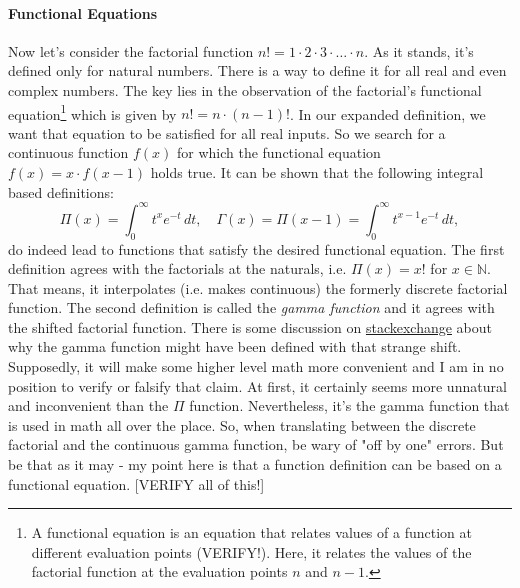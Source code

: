 


\paragraph{Functional Equations}
Now let's consider the factorial function $n! = 1 \cdot 2 \cdot 3 \cdot \ldots \cdot n$. As it stands, it's defined only for natural numbers. There is a way to define it for all real and even complex numbers. The key lies in the observation of the factorial's functional equation\footnote{A functional equation is an equation that relates values of a function at different evaluation points (VERIFY!). Here, it relates the values of the factorial function at the evaluation points $n$ and $n-1$.} which is given by $n! = n \cdot (n-1)!$. In our expanded definition, we want that equation to be satisfied for all real inputs. So we search for a continuous function $f(x)$ for which the functional equation $f(x) = x \cdot f(x-1)$ holds true. It can be shown that the following integral based definitions:
\begin{equation}
\Pi(x)    = \int_0^\infty t^x e^{-t} \, dt, \quad
\Gamma(x) = \Pi(x-1) = \int_0^\infty t^{x-1} e^{-t} \, dt,
\end{equation}
do indeed lead to functions that satisfy the desired functional equation. The first definition agrees with the factorials at the naturals, i.e. $\Pi(x) = x!$ for $x \in \mathbb{N}$. That means, it interpolates (i.e. makes continuous) the formerly discrete factorial function. The second definition is called the \emph{gamma function} and it agrees with the shifted factorial function. There is some discussion on \href{https://math.stackexchange.com/questions/1362523/why-is-the-gamma-function-off-by-1-from-the-factorial}{stackexchange} about why the gamma function might have been defined with that strange shift. Supposedly, it will make some higher level math more convenient and I am in no position to verify or falsify that claim. At first, it certainly seems more unnatural and inconvenient than the $\Pi$ function. Nevertheless, it's the gamma function that is used in math all over the place. So, when translating between the discrete factorial and the continuous gamma function, be wary of "off by one" errors. But be that as it may - my point here is that a function definition can be based on a functional equation. 
[VERIFY all of this!]

